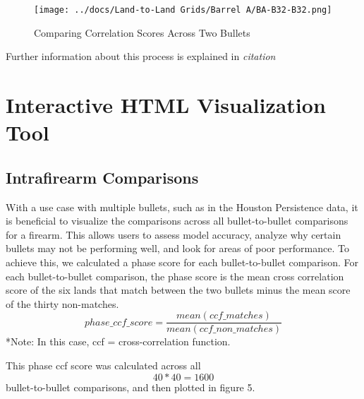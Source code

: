\documentclass[
  number]{elsarticle}
\begin{document}
\begin{figure}[H]

{\centering \texttt{[image: ../docs/Land-to-Land Grids/Barrel A/BA-B32-B32.png]}

}

\caption{Comparing Correlation Scores Across Two Bullets}

\end{figure}

Further information about this process is explained in \emph{citation}

\hypertarget{interactive-html-visualization-tool}{%
\section{Interactive HTML Visualization
Tool}\label{interactive-html-visualization-tool}}

\hypertarget{intrafirearm-comparisons}{%
\subsection{Intrafirearm Comparisons}\label{intrafirearm-comparisons}}

With a use case with multiple bullets, such as in the Houston
Persistence data, it is beneficial to visualize the comparisons across
all bullet-to-bullet comparisons for a firearm. This allows users to
assess model accuracy, analyze why certain bullets may not be performing
well, and look for areas of poor performance. To achieve this, we
calculated a phase score for each bullet-to-bullet comparison. For each
bullet-to-bullet comparison, the phase score is the mean cross
correlation score of the six lands that match between the two bullets
minus the mean score of the thirty non-matches. \[ 
  phase\_ccf\_score = \frac{mean(ccf\_matches)}{mean(ccf\_non\_matches)}
\] *Note: In this case, ccf = cross-correlation function.

This phase ccf score was calculated across all \[40 * 40 = 1600\]
bullet-to-bullet comparisons, and then plotted in figure 5.
\end{document}

